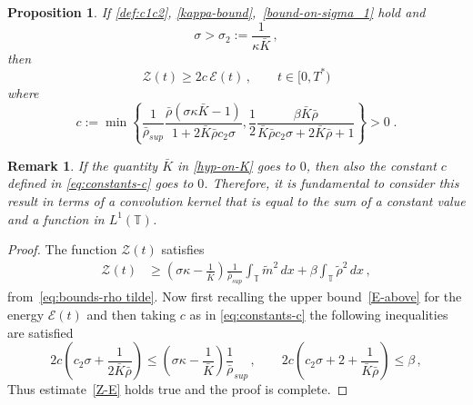 \documentclass[10pt,reqno]{amsart}
\newtheorem{proposition}{Proposition}[section]
\newtheorem{remark}{Remark}[section]
\newcommand{\bbt} {\mathbb T}
\begin{document}
\begin{proposition}\label{prop:3.3}
If \eqref{def:c1c2}, \eqref{kappa-bound},~\eqref{bound-on-sigma_1} hold and 
\begin{equation}\label{bound-on-sigma_2}
\sigma>\sigma_2:=\frac{1}{\kappa\bar K}\,,
\end{equation}
then 
\begin{equation}\label{Z-E}
    \mathcal Z(t)\geq 2c \,\mathcal E(t)\,,\qquad t\in[0,T^*)
\end{equation}
where
\begin{equation}
c :=\min\left\{\frac{1}{\bar\rho_{sup}}\frac{\bar\rho(\sigma\kappa \bar K -1)}{1+2\bar K\bar\rho c_2\sigma},\frac{1}{2}\frac{\beta\bar K\bar\rho}{\bar K\bar\rho c_2\sigma+2\bar K\bar\rho+1} \right\} >0\;.\label{eq:constants-c}
\end{equation}
\end{proposition}

\begin{remark}
    If the quantity $\bar K$ in \eqref{hyp-on-K} goes to $0$, then also the constant $c$ defined in \eqref{eq:constants-c} goes to $0$. Therefore, it is fundamental to consider this result in terms of a convolution kernel that is equal to the sum of a constant value and a function in $L^1(\bbt)$.
\end{remark}

\begin{proof} The function $\mathcal Z(t)$ satisfies
\begin{align*}
    \mathcal{Z}(t) & \geq \left( \sigma\kappa-\frac{1}{\bar K}\right)\frac{1}{\bar\rho_{sup}}%
    \int_\bbt \tilde m^2\,dx + \beta \int_\bbt \tilde\rho^2\,dx\,,
\end{align*}
from~\eqref{eq:bounds-rho tilde}. Now first recalling the upper bound~\eqref{E-above} for the energy $\mathcal{E}(t)$ 
and then taking $c$ as in \eqref{eq:constants-c} the following inequalities are satisfied
\begin{equation*}
  2c \left( c_2\sigma+\frac{1}{2\bar K\bar\rho} \right)\le \left(\sigma\kappa-\frac{1}{\bar K}\right)\frac{1}{\bar\rho}_{sup}
  \,,\qquad 
  2c\left(  c_2\sigma+2+\frac{1}{\bar K\bar\rho} \right)\le \beta \,,
\end{equation*}
Thus estimate~\eqref{Z-E} holds true and the proof is complete.
\end{proof}
\end{document}
